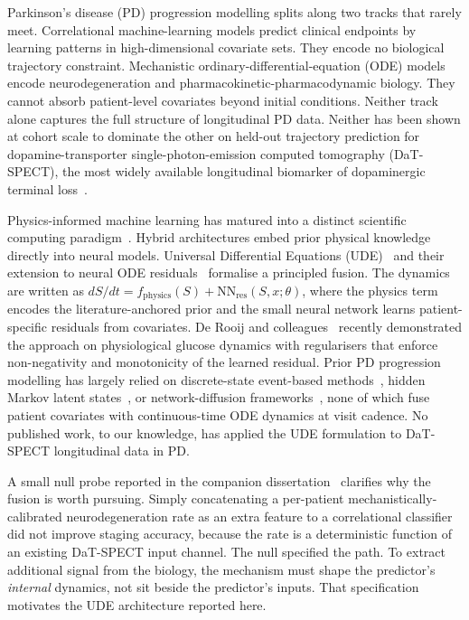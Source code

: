 Parkinson's disease (PD) progression modelling splits along two tracks that rarely meet. Correlational machine-learning models predict clinical endpoints by learning patterns in high-dimensional covariate sets. They encode no biological trajectory constraint. Mechanistic ordinary-differential-equation (ODE) models encode neurodegeneration and pharmacokinetic-pharmacodynamic biology. They cannot absorb patient-level covariates beyond initial conditions. Neither track alone captures the full structure of longitudinal PD data. Neither has been shown at cohort scale to dominate the other on held-out trajectory prediction for dopamine-transporter single-photon-emission computed tomography (DaT-SPECT), the most widely available longitudinal biomarker of dopaminergic terminal loss~\cite{brumm2023milestone, pagano2018datspect}.

Physics-informed machine learning has matured into a distinct scientific computing paradigm~\cite{karniadakis2021pinn, willard2022pinnsurvey}. Hybrid architectures embed prior physical knowledge directly into neural models. Universal Differential Equations (UDE)~\cite{rackauckas2020universal} and their extension to neural ODE residuals~\cite{chen2018neuralode} formalise a principled fusion. The dynamics are written as $dS/dt = f_{\mathrm{physics}}(S) + \mathrm{NN}_{\mathrm{res}}(S, x; \theta)$, where the physics term encodes the literature-anchored prior and the small neural network learns patient-specific residuals from covariates. De Rooij and colleagues~\cite{deRooij2025physiology} recently demonstrated the approach on physiological glucose dynamics with regularisers that enforce non-negativity and monotonicity of the learned residual. Prior PD progression modelling has largely relied on discrete-state event-based methods~\cite{oxtoby2021ebm}, hidden Markov latent states~\cite{severson2021progression}, or network-diffusion frameworks~\cite{raj2015network}, none of which fuse patient covariates with continuous-time ODE dynamics at visit cadence. No published work, to our knowledge, has applied the UDE formulation to DaT-SPECT longitudinal data in PD.

A small null probe reported in the companion dissertation~\cite{dupre2026dissertation} clarifies why the fusion is worth pursuing. Simply concatenating a per-patient mechanistically-calibrated neurodegeneration rate as an extra feature to a correlational classifier~\cite{dupre2026paper3} did not improve staging accuracy, because the rate is a deterministic function of an existing DaT-SPECT input channel. The null specified the path. To extract additional signal from the biology, the mechanism must shape the predictor's \emph{internal} dynamics, not sit beside the predictor's inputs. That specification motivates the UDE architecture reported here.

